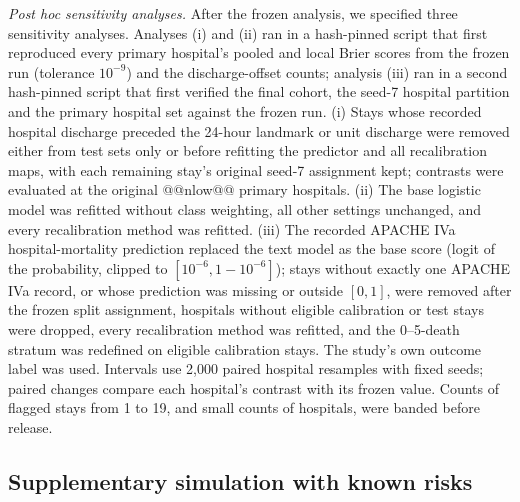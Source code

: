 \documentclass[11pt]{article}
\begin{document}
\textit{Post hoc sensitivity analyses.} After the frozen analysis, we specified three sensitivity analyses. Analyses (i) and (ii) ran in a hash-pinned script that first reproduced every primary hospital's pooled and local Brier scores from the frozen run (tolerance $10^{-9}$) and the discharge-offset counts; analysis (iii) ran in a second hash-pinned script that first verified the final cohort, the seed-7 hospital partition and the primary hospital set against the frozen run. (i) Stays whose recorded hospital discharge preceded the 24-hour landmark or unit discharge were removed either from test sets only or before refitting the predictor and all recalibration maps, with each remaining stay's original seed-7 assignment kept; contrasts were evaluated at the original @@nlow@@ primary hospitals. (ii) The base logistic model was refitted without class weighting, all other settings unchanged, and every recalibration method was refitted. (iii) The recorded APACHE IVa hospital-mortality prediction replaced the text model as the base score (logit of the probability, clipped to $[10^{-6}, 1-10^{-6}]$); stays without exactly one APACHE IVa record, or whose prediction was missing or outside $[0, 1]$, were removed after the frozen split assignment, hospitals without eligible calibration or test stays were dropped, every recalibration method was refitted, and the 0--5-death stratum was redefined on eligible calibration stays. The study's own outcome label was used. Intervals use 2,000 paired hospital resamples with fixed seeds; paired changes compare each hospital's contrast with its frozen value. Counts of flagged stays from 1 to 19, and small counts of hospitals, were banded before release.

\subsection*{Supplementary simulation with known risks}\label{simulation-methods}
\end{document}
